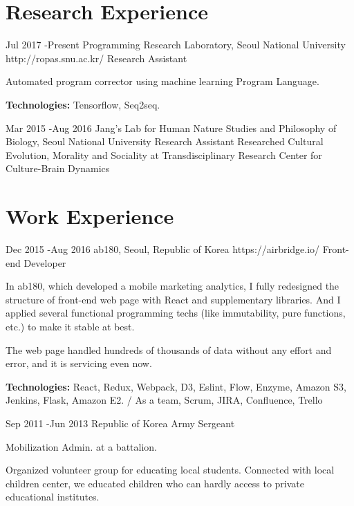 \documentclass[10pt]{article} %
\begin{document}

\section{Research Experience}

\job
{Jul 2017 -}{Present}
{Programming Research Laboratory, Seoul National University}
{http://ropas.snu.ac.kr/}
{Research Assistant}
{Automated program corrector using machine learning Program Language.\\
\rule{0mm}{5mm}\textbf{Technologies:} Tensorflow, Seq2seq.}


\job
{Mar 2015 -}{Aug 2016}
{Jang’s Lab for Human Nature Studies and Philosophy of Biology, Seoul National University}
{}
{Research Assistant}
{Researched Cultural Evolution, Morality and Sociality at Transdisciplinary Research Center for Culture-Brain Dynamics}


\section{Work Experience}

\job
{Dec 2015 -}{Aug 2016}
{ab180, Seoul, Republic of Korea}
{https://airbridge.io/}
{Front-end Developer}
{In ab180, which developed a mobile marketing analytics, I fully redesigned the structure of front-end web page with React and supplementary libraries. And I applied several functional programming techs (like immutability, pure functions, etc.) to make it stable at best.

The web page handled hundreds of thousands of data without any effort and error, and it is servicing even now.\\
\rule{0mm}{5mm}\textbf{Technologies:} React, Redux, Webpack, D3, Eslint, Flow, Enzyme, Amazon S3, Jenkins, Flask, Amazon E2. / As a team, Scrum, JIRA, Confluence, Trello}


\job
{Sep 2011 -}{Jun 2013}
{Republic of Korea Army}
{}
{Sergeant}
{Mobilization Admin. at a battalion.

Organized volunteer group for educating local students. Connected with local children center, we educated children who can hardly access to private educational institutes. 
}
\end{document}
